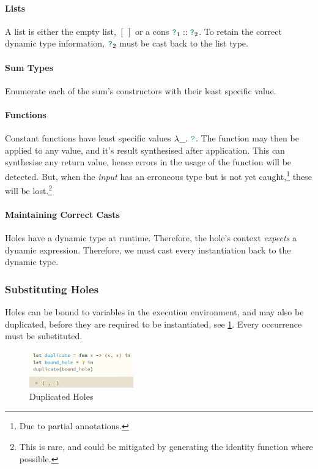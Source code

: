 \paragraph{Lists} A list is either the empty list, $[\ ]$ or a cons ${\color{teal}\texttt{?}}_1 :: {\color{teal}\texttt{?}}_2$. To retain the correct dynamic type information, ${\color{teal}\texttt{?}}_2$ must be cast back to the list type. 
\paragraph{Sum Types} Enumerate each of the sum's constructors with their least specific value.
\paragraph{Functions} Constant functions have least specific values $\lambda \_.\ {\color{teal}\texttt{?}}$. The function may then be applied to any value, and it's result synthesised after application. This can synthesise any return value, hence errors in the usage of the function will be detected. But, when the \textit{input} has an erroneous type but is not yet caught,\footnote{Due to partial annotations.} these will be lost.\footnote{This is rare, and could be mitigated by generating the identity function where possible.}

\paragraph{Maintaining Correct Casts}
Holes have a dynamic type at runtime. Therefore, the hole's context \textit{expects} a dynamic expression. Therefore, we must cast every instantiation back to the dynamic type.

\subsubsection{Substituting Holes}\label{sec:HoleSubstitutionImplementation}
Holes can be bound to variables in the execution environment, and may also be duplicated, before they are required to be instantiated, see \cref{fig:HoleDuplication}. Every occurrence must be substituted.

\begin{figure}[h]
\centering
\includegraphics[width=0.4\textwidth]{Media/Figures/duplicate_hole}
\caption{Duplicated Holes}
\label{fig:HoleDuplication}
\end{figure}


